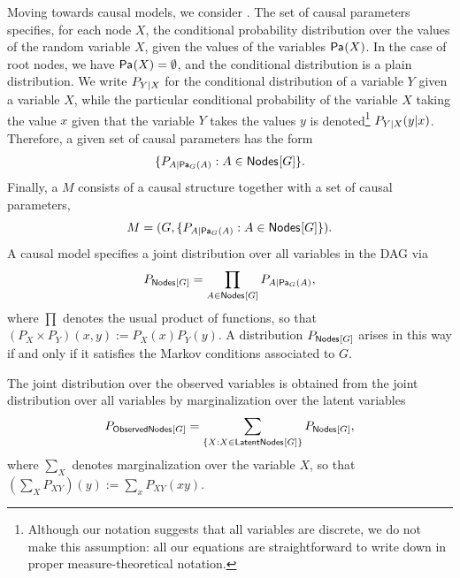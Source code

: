 Moving towards causal models, we consider . The set of causal parameters specifies, for each node $X$, the conditional probability distribution over the values of the random variable $X$, given the values of the variables $\Pa{X}$.  In the case of root nodes, we have $\Pa{X} = \emptyset$, and the conditional distribution is a plain distribution.
We write $\pfunc{Y|X}$ for the conditional distribution of a variable $Y$ given a variable $X$, while the particular conditional probability of the variable $X$ taking the value $x$ given that the variable $Y$ takes the values $y$ is denoted\footnote{Although our notation suggests that all variables are discrete, we do not make this assumption: all our equations are straightforward to write down in proper measure-theoretical notation.} $\pdf[Y|X]{y|x}$.    Therefore, a given set of causal parameters has the form
\begin{align}
 \{ \pfunc{A|\Pa[G]{A}} : A \in \SmallNamedFunction{Nodes}{G} \}.
\end{align}
Finally, a  $M$ consists of a causal structure together with a set of causal parameters,
\[
	M = ( G,   \{ \pfunc{A|\Pa[G]{A}} : A \in \SmallNamedFunction{Nodes}{G} \}).
\]
A causal model specifies a joint distribution over all variables in the DAG via
\begin{align}\label{Markov}
P_{\nodes{G}} = \prod_{A\in \SmallNamedFunction{Nodes}{G}} \pfunc{A|\Pa[G]{A}},
\end{align}
where $\prod$ denotes the usual product of functions, so that $(P_X \times P_Y)(x,y) := P_X(x) P_Y(y)$. A distribution $P_{\nodes{G}}$ arises in this way if and only if it satisfies the Markov conditions associated to $G$.

The joint distribution over the observed variables is obtained from the joint distribution over all variables by marginalization over the latent variables 
\begin{align}\label{MarkovObserved}
P_{\SmallNamedFunction{ObservedNodes}{G}} =  \sum_{\{X :X \in\SmallNamedFunction{LatentNodes}{G}\}} P_{\SmallNamedFunction{Nodes}{G}},
\end{align}
where $\sum_X$ denotes marginalization over the variable $X$, so that $(\sum_X P_{XY})(y):= \sum_x P_{XY}(xy)$.

